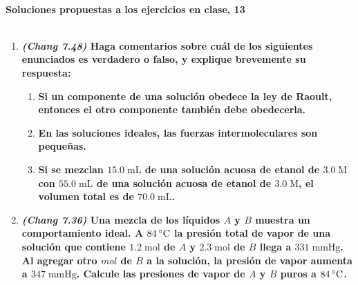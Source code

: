 \documentclass[a4paper,12pt]{article}
\begin{document}

\begin{center}
\HRule \\[0.4cm]
{ \bfseries Soluciones propuestas a los ejercicios en clase, 13}\\ %
\HRule \\[0.4cm]
\end{center}


\begin{enumerate}

 \item \textbf{\textit{(Chang 7.48)} Haga comentarios sobre cu\'al de los siguientes enunciados es verdadero o falso, y explique brevemente su respuesta:}
\begin{enumerate}
 \item \textbf{Si un componente de una soluci\'on obedece la ley de Raoult, entonces el otro componente tambi\'en debe obedecerla.}



 \item \textbf{En las soluciones ideales, las fuerzas intermoleculares son peque\~nas.}



 \item \textbf{Si se mezclan $15.0\;\mbox{mL}$ de una soluci\'on acuosa de etanol de $3.0\;\mbox{M}$ con $55.0\;\mbox{mL}$ de una soluci\'on acuosa de etanol de $3.0\;\mbox{M}$, el volumen total es de $70.0\;\mbox{mL}$.}



\end{enumerate} %

 \item \textbf{\textit{(Chang 7.36)} Una mezcla de los l\'iquidos $A$ y $B$ muestra un comportamiento ideal. A $84\,\celsius$ la presi\'on total de vapor de una soluci\'on que contiene $1.2\;\mbox{mol}$ de $A$ y $2.3\;\mbox{mol}$ de $B$ llega a $331\;\mbox{mmHg}$. Al agregar otro $mol$ de $B$ a la soluci\'on, la presi\'on de vapor aumenta a $347\;\mbox{mmHg}$. Calcule las presiones de vapor de $A$ y $B$ puros a $84\,\celsius$.} %




\end{enumerate}
\end{document}
